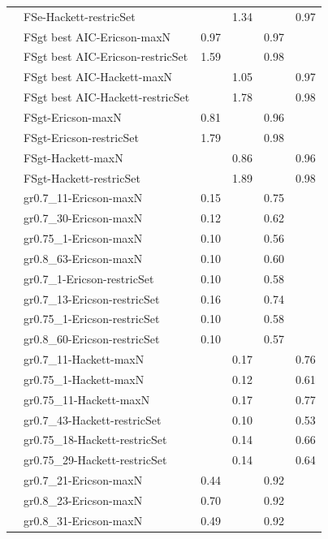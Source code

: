 \begin{footnotesize}
\begin{longtable}{@{}ll|rr|rr@{}}
 & FSe-Hackett-restricSet &      & 1.34 &      & 0.97\\
\addlinespace
\multirow{8}{*}{FSgt} & FSgt best AIC-Ericson-maxN & 0.97 &      & 0.97 &     \\
 & FSgt best AIC-Ericson-restricSet & 1.59 &      & 0.98 &     \\
 & FSgt best AIC-Hackett-maxN &      & 1.05 &      & 0.97\\
 & FSgt best AIC-Hackett-restricSet &      & 1.78 &      & 0.98\\
 & FSgt-Ericson-maxN & 0.81 &      & 0.96 &     \\
 & FSgt-Ericson-restricSet & 1.79 &      & 0.98 &     \\
 & FSgt-Hackett-maxN &      & 0.86 &      & 0.96\\
 & FSgt-Hackett-restricSet &      & 1.89 &      & 0.98\\
\addlinespace
\multirow{14}{*}{Iteroparity} & gr0.7\_11-Ericson-maxN & 0.15 &      & 0.75 &     \\
 & gr0.7\_30-Ericson-maxN & 0.12 &      & 0.62 &     \\
 & gr0.75\_1-Ericson-maxN & 0.10 &      & 0.56 &     \\
 & gr0.8\_63-Ericson-maxN & 0.10 &      & 0.60 &     \\
 & gr0.7\_1-Ericson-restricSet & 0.10 &      & 0.58 &     \\
 & gr0.7\_13-Ericson-restricSet & 0.16 &      & 0.74 &     \\
 & gr0.75\_1-Ericson-restricSet & 0.10 &      & 0.58 &     \\
 & gr0.8\_60-Ericson-restricSet & 0.10 &      & 0.57 &     \\
 & gr0.7\_11-Hackett-maxN &      & 0.17 &      & 0.76\\
 & gr0.75\_1-Hackett-maxN &      & 0.12 &      & 0.61\\
 & gr0.75\_11-Hackett-maxN &      & 0.17 &      & 0.77\\
 & gr0.7\_43-Hackett-restricSet &      & 0.10 &      & 0.53\\
 & gr0.75\_18-Hackett-restricSet &      & 0.14 &      & 0.66\\
 & gr0.75\_29-Hackett-restricSet &      & 0.14 &      & 0.64\\
\addlinespace
\pagebreak
\multirow{11}{*}{EMR} & gr0.7\_21-Ericson-maxN & 0.44 &      & 0.92 &     \\
 & gr0.8\_23-Ericson-maxN & 0.70 &      & 0.92 &     \\
 & gr0.8\_31-Ericson-maxN & 0.49 &      & 0.92 &     \\

\end{longtable}
\end{footnotesize}
